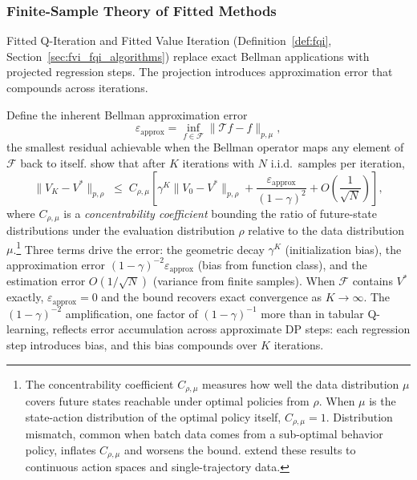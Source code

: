 \subsubsection{Finite-Sample Theory of Fitted Methods}
\label{sec:fvi_fqi_theory}

Fitted Q-Iteration and Fitted Value Iteration (Definition~\ref{def:fqi}, Section~\ref{sec:fvi_fqi_algorithms}) replace exact Bellman applications with projected regression steps. The projection introduces approximation error that compounds across iterations.

Define the inherent Bellman approximation error
\begin{equation}
\varepsilon_{\mathrm{approx}} = \inf_{f \in \mathcal{F}} \| \mathcal{T} f - f \|_{p,\mu},
\end{equation}
the smallest residual achievable when the Bellman operator maps any element of $\mathcal{F}$ back to itself. \citet{MunosSzepesvari2008} show that after $K$ iterations with $N$ i.i.d.\ samples per iteration,
\begin{equation}
\| V_{K} - V^* \|_{p,\rho} \;\leq\; C_{\rho,\mu} \left[ \gamma^K \|V_0 - V^*\|_{p,\rho} + \frac{\varepsilon_{\mathrm{approx}}}{(1-\gamma)^2} + O\!\left(\frac{1}{\sqrt{N}}\right) \right],
\label{eq:fvi_error_bound}
\end{equation}
where $C_{\rho,\mu}$ is a \emph{concentrability coefficient} bounding the ratio of future-state distributions under the evaluation distribution $\rho$ relative to the data distribution $\mu$.\footnote{The concentrability coefficient $C_{\rho,\mu}$ measures how well the data distribution $\mu$ covers future states reachable under optimal policies from $\rho$. When $\mu$ is the state-action distribution of the optimal policy itself, $C_{\rho,\mu} = 1$. Distribution mismatch, common when batch data comes from a sub-optimal behavior policy, inflates $C_{\rho,\mu}$ and worsens the bound. \citet{Antos2008} extend these results to continuous action spaces and single-trajectory data.} Three terms drive the error: the geometric decay $\gamma^K$ (initialization bias), the approximation error $(1-\gamma)^{-2} \varepsilon_{\mathrm{approx}}$ (bias from function class), and the estimation error $O(1/\sqrt{N})$ (variance from finite samples). When $\mathcal{F}$ contains $V^*$ exactly, $\varepsilon_{\mathrm{approx}} = 0$ and the bound recovers exact convergence as $K \to \infty$. The $(1-\gamma)^{-2}$ amplification, one factor of $(1-\gamma)^{-1}$ more than in tabular Q-learning, reflects error accumulation across approximate DP steps: each regression step introduces bias, and this bias compounds over $K$ iterations.

